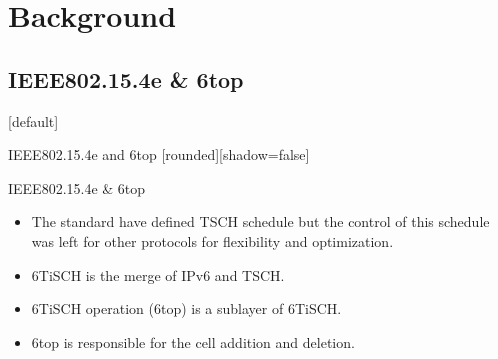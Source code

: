 \documentclass{beamer}
\makeatletter
\newenvironment{withoutheadline}{
        \setbeamertemplate{headline}[default]
        \def\beamer@entrycode{\vspace*{-\headheight}}
    }{}
\makeatother
\begin{document}


\section{Background}
\subsection{IEEE802.15.4e \& 6top}
\begin{withoutheadline}
\begin{frame}{IEEE802.15.4e and 6top}
[rounded][shadow=false]




\begin{block}{IEEE802.15.4e \& 6top}
    \begin{itemize}
    \item The standard have defined TSCH schedule but the control of this schedule  was left for other protocols for flexibility and optimization.
    \item 6TiSCH is the merge of IPv6 and TSCH. 
    \item 6TiSCH operation (6top) is a sublayer of 6TiSCH.
    \item 6top is responsible for the cell addition and deletion. 
    
    \end{itemize}
    \end{block}
\end{frame}
\end{withoutheadline}
\end{document}
